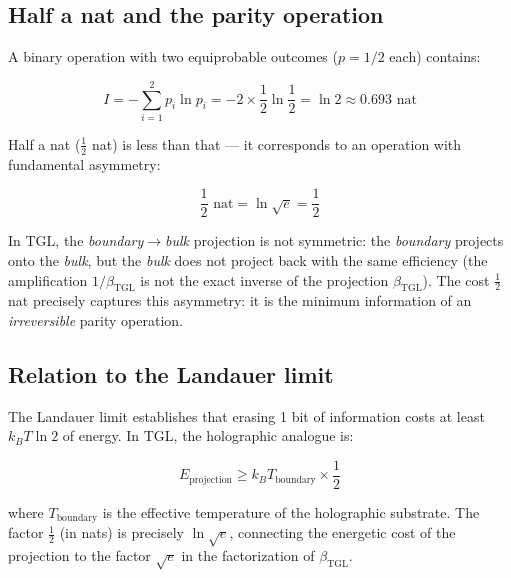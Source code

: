\documentclass[12pt,a4paper,twoside]{article}
\newcommand{\betatgl}{\beta_{\!\scriptscriptstyle\mathrm{TGL}}}
\newcommand{\boundary}{\textit{boundary}}
\newcommand{\bulk}{\textit{bulk}}
\begin{document}
\subsection{Half a nat and the parity operation}

A binary operation with two equiprobable outcomes ($p = 1/2$ each) contains:

\begin{equation}
I = -\sum_{i=1}^{2} p_i \ln p_i = -2 \times \frac{1}{2} \ln \frac{1}{2} = \ln 2 \approx 0.693 \text{ nat}
\end{equation}

Half a nat ($\frac{1}{2}$ nat) is less than that --- it corresponds to an operation with fundamental asymmetry:

\begin{equation}
\frac{1}{2} \text{ nat} = \ln \sqrt{e} = \frac{1}{2}
\end{equation}

In TGL, the \boundary$\to$\bulk{} projection is not symmetric: the \boundary{} projects onto the \bulk{}, but the \bulk{} does not project back with the same efficiency (the amplification $1/\betatgl$ is not the exact inverse of the projection $\betatgl$). The cost $\frac{1}{2}$ nat precisely captures this asymmetry: it is the minimum information of an \textit{irreversible} parity operation.

\subsection{Relation to the Landauer limit}

The Landauer limit \cite{Landauer1961} establishes that erasing 1 bit of information costs at least $k_B T \ln 2$ of energy. In TGL, the holographic analogue is:

\begin{equation}
E_{\text{projection}} \geq k_B T_{\text{boundary}} \times \frac{1}{2}
\end{equation}

\noindent where $T_{\text{boundary}}$ is the effective temperature of the holographic substrate. The factor $\frac{1}{2}$ (in nats) is precisely $\ln\sqrt{e}$, connecting the energetic cost of the projection to the factor $\sqrt{e}$ in the factorization of $\betatgl$.


\end{document}
